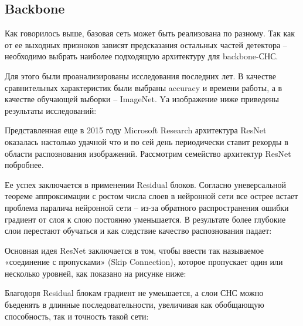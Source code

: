 \subsection{Backbone}

Как говорилось выше, базовая сеть может быть реализована по разному. Так как от ее выходных призноков зависят предсказания остальных частей детектора -- необходимо выбрать наиболее подходящую архитектуру для backbone-СНС.

Для этого были проанализированы исследования последних лет. В качестве сравнительных характеристик были выбраны accuracy и времени работы, а в качестве обучающей выборки -- ImageNet. Yа изображение ниже приведены результаты исследований:



Представленная еще в 2015 году Microsoft Research архитектура ResNet оказалась настолько удачной что и по сей день периодически ставит рекорды в области распознования изображений. Рассмотрим семейство архитектур ResNet побробнее.

Ее успех заключается в применении Residual блоков. Согласно уневерсальной теореме аппроксимации с ростом числа слоев в нейронной сети все острее встает проблема паралича нейронной сети -- из-за обратного распространения ошибки градиент от слоя к слою постоянно уменьшается. В результате более глубокие слои перестают обучаться и как следствие качество распознования падает:


Основная идея ResNet заключается в том, чтобы ввести так называемое «соединение с пропусками» (Skip Connection), которое пропускает один или несколько уровней, как показано на рисунке ниже:


Благодоря Residual блокам градиент не умеьшается, а слои СНС можно бъеденять в длинные последовательности, увеличивая как обобщающую способность, так и точность такой сети:

